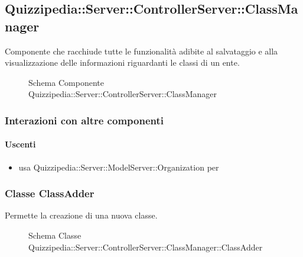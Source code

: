 \subsection{Quizzipedia::Server::ControllerServer::ClassManager}
Componente che racchiude tutte le funzionalità adibite al salvataggio e alla visualizzazione delle informazioni riguardanti le classi di un ente.
\begin{figure}[H]
\centering
\noindent{}
\caption[Schema Componente Quizzipedia::Server::ControllerServer::ClassManager]{Schema Componente Quizzipedia::Server::ControllerServer::ClassManager}
\end{figure}
\subsubsection{Interazioni con altre componenti}
\paragraph{Uscenti}
\begin{itemize}
\item usa Quizzipedia::Server::ModelServer::Organization per 
\end{itemize}
\subsubsection{Classe ClassAdder}
Permette la creazione di una nuova classe.
\begin{figure}[H]
\centering
\noindent{}
\caption[Schema Classe ClassAdder]{Schema Classe Quizzipedia::Server::ControllerServer::ClassManager::ClassAdder}
\end{figure}
